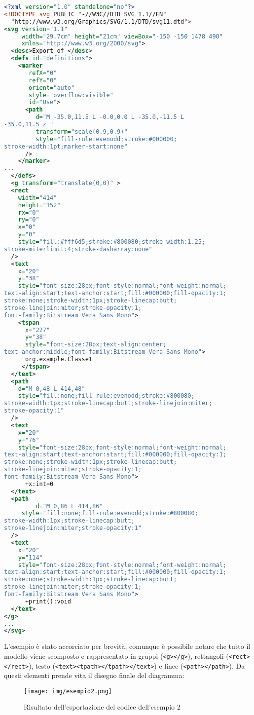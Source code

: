 \begin{lstlisting}[language=xml, caption={Un esempio di codice SVG generato}]
<?xml version="1.0" standalone="no"?>
<!DOCTYPE svg PUBLIC "-//W3C//DTD SVG 1.1//EN" 
  "http://www.w3.org/Graphics/SVG/1.1/DTD/svg11.dtd">
<svg version="1.1"
     width="29.7cm" height="21cm" viewBox="-150 -150 1478 490"
     xmlns="http://www.w3.org/2000/svg">
  <desc>Export of </desc>
  <defs id="definitions">
    <marker
       refX="0"
       refY="0"
       orient="auto"
       style="overflow:visible"
       id="Use">
      <path
         d="M -35.0,11.5 L -0.0,0.0 L -35.0,-11.5 L 
-35.0,11.5 z "
         transform="scale(0.9,0.9)"
         style="fill-rule:evenodd;stroke:#000000;
stroke-width:1pt;marker-start:none"
      />
    </marker>
...
  </defs>
  <g transform="translate(0,0)" >
  <rect
    width="414"
    height="152"
    rx="0"
    ry="0"
    x="0"
    y="0"
    style="fill:#fff6d5;stroke:#800080;stroke-width:1.25;
stroke-miterlimit:4;stroke-dasharray:none"
  />
  <text
    x="20"
    y="38"
    style="font-size:28px;font-style:normal;font-weight:normal;
text-align:start;text-anchor:start;fill:#000000;fill-opacity:1;
stroke:none;stroke-width:1px;stroke-linecap:butt;
stroke-linejoin:miter;stroke-opacity:1;
font-family:Bitstream Vera Sans Mono">
    <tspan
      x="227"
      y="38"
      style="font-size:28px;text-align:center;
text-anchor:middle;font-family:Bitstream Vera Sans Mono">
      org.example.Classe1
     </tspan>
  </text>
  <path
    d="M 0,48 L 414,48"
    style="fill:none;fill-rule:evenodd;stroke:#800080;
stroke-width:1px;stroke-linecap:butt;stroke-linejoin:miter;
stroke-opacity:1"
  />
  <text
    x="20"
    y="76"
    style="font-size:28px;font-style:normal;font-weight:normal;
text-align:start;text-anchor:start;fill:#000000;fill-opacity:1;
stroke:none;stroke-width:1px;stroke-linecap:butt;
stroke-linejoin:miter;stroke-opacity:1;
font-family:Bitstream Vera Sans Mono">
      +x:int=0
  </text>
  <path
         d="M 0,86 L 414,86"
     style="fill:none;fill-rule:evenodd;stroke:#800080;
stroke-width:1px;stroke-linecap:butt;
stroke-linejoin:miter;stroke-opacity:1"
  />
  <text
    x="20"
    y="114"
    style="font-size:28px;font-style:normal;font-weight:normal;
text-align:start;text-anchor:start;fill:#000000;fill-opacity:1;
stroke:none;stroke-width:1px;stroke-linecap:butt;
stroke-linejoin:miter;stroke-opacity:1;
font-family:Bitstream Vera Sans Mono">
      +print():void
  </text>
</g>
...
</svg>
\end{lstlisting}

L'esempio è stato accorciato per brevità, comunque è possibile notare 
che tutto il modello viene scomposto e rappresentato in gruppi
(\lstinline{<g></g>}), rettangoli (\lstinline{<rect></rect>}), testo 
(\lstinline{<text><tpath></tpath></text>}) e linee (\lstinline{<path></path>}).
Da questi elementi prende vita il disegno finale del diagramma:

\begin{figure}[htp]
\begin{center}
  \texttt{[image: img/esempio2.png]}
  \caption[labelInTOC]{Risultato dell'esportazione del codice dell'esempio 2}
\end{center}
\end{figure}

